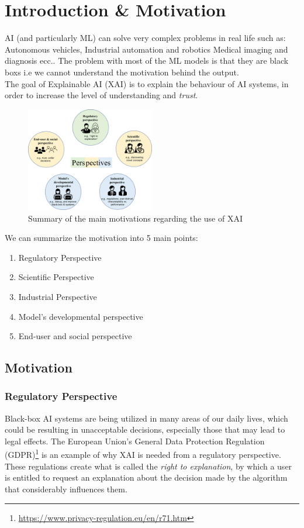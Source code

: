 \section{Introduction \& Motivation}
AI (and particularly ML) can solve very complex problems in real life such as: Autonomous vehicles, Industrial automation and robotics Medical imaging and diagnosis ecc..
The problem with most of the ML models is that they are black boxs i.e we cannot understand the motivation behind the output.\\

The goal of Explainable AI (XAI) is to explain the behaviour of AI systems, in order to increase the
level of understanding and \emph{trust}. 
\begin{figure}[H]
    \includegraphics[width=0.5\textwidth]{img/motivation.jpg}
    \centering
    \caption{Summary of the main motivations regarding the use of XAI}
\end{figure}
We can summarize the motivation into 5 main points:
\begin{enumerate}
    \item Regulatory Perspective
    \item Scientific Perspective
    \item Industrial Perspective
    \item Model's developmental perspective
    \item End-user and social perspective
\end{enumerate}
\subsection{Motivation}
\subsubsection*{Regulatory Perspective}
Black-box AI systems are being utilized in many areas of our daily lives, which could be resulting in unacceptable decisions, especially those that may lead to legal effects. 
The European Union's General Data Protection Regulation (GDPR)\footnote{\url{https://www.privacy-regulation.eu/en/r71.htm}} is an example of why XAI is needed from a regulatory perspective. 
These regulations create what is called the \emph{right to explanation}, by which a user is entitled to request an explanation about the decision made by the algorithm that considerably influences them.

